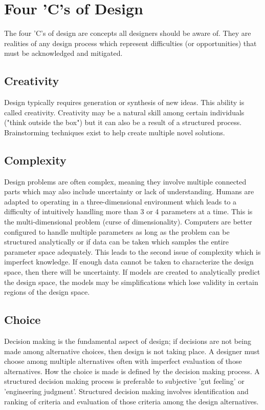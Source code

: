 \documentclass[12pt]{article}
\begin{document}
\newpage

\section{Four 'C's of Design}
The four 'C's of design are concepts all designers should be aware of.
They are realities of any design process which represent difficulties (or opportunities) that must be acknowledged and mitigated.

\subsection{Creativity}
Design typically requires generation or synthesis of new ideas.
This ability is called creativity.
Creativity may be a natural skill among certain individuals ("think outside the box") but it can also be a result of a structured process.
Brainstorming techniques exist to help create multiple novel solutions.

\subsection{Complexity}
Design problems are often complex, meaning they involve multiple connected parts which may also include uncertainty or lack of understanding.
Humans are adapted to operating in a three-dimensional environment which leads to a difficulty of intuitively handling more than 3 or 4 parameters at a time.
This is the multi-dimensional problem (curse of dimensionality).
Computers are better configured to handle multiple parameters as long as the problem can be structured analytically or if data can be taken which samples the entire parameter space adequately.
This leads to the second issue of complexity which is imperfect knowledge.
If enough data cannot be taken to characterize the design space, then there will be uncertainty.
If models are created to analytically predict the design space, the models may be simplifications which lose validity in certain regions of the design space.

\subsection{Choice}
Decision making is the fundamental aspect of design; if decisions are not being made among alternative choices, then design is not taking place.
A designer must choose among multiple alternatives often with imperfect evaluation of those alternatives.
How the choice is made is defined by the decision making process.
A structured decision making process is preferable to subjective 'gut feeling' or 'engineering judgment'.
Structured decision making involves identification and ranking of criteria and evaluation of those criteria among the design alternatives.
\end{document}
